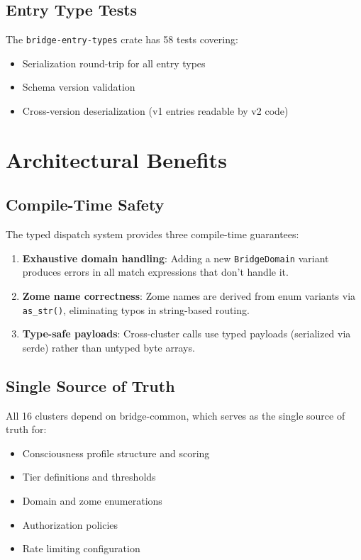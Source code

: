 \documentclass[11pt,twocolumn]{article}
\begin{document}
\subsection{Entry Type Tests}

The \texttt{bridge-entry-types} crate has 58 tests covering:
\begin{itemize}[nosep]
  \item Serialization round-trip for all entry types
  \item Schema version validation
  \item Cross-version deserialization (v1 entries readable by v2 code)
\end{itemize}

\section{Architectural Benefits}

\subsection{Compile-Time Safety}

The typed dispatch system provides three compile-time guarantees:

\begin{enumerate}[nosep]
  \item \textbf{Exhaustive domain handling}: Adding a new \texttt{BridgeDomain}
    variant produces errors in all match expressions that don't handle it.
  \item \textbf{Zome name correctness}: Zome names are derived from enum
    variants via \texttt{as\_str()}, eliminating typos in string-based routing.
  \item \textbf{Type-safe payloads}: Cross-cluster calls use typed payloads
    (serialized via serde) rather than untyped byte arrays.
\end{enumerate}

\subsection{Single Source of Truth}

All 16 clusters depend on bridge-common, which serves as the single source
of truth for:

\begin{itemize}[nosep]
  \item Consciousness profile structure and scoring
  \item Tier definitions and thresholds
  \item Domain and zome enumerations
  \item Authorization policies
  \item Rate limiting configuration
\end{itemize}
\end{document}
